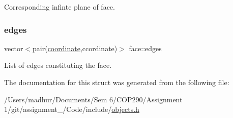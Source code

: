 Corresponding infinte plane of face. 

\mbox{\label{structface_a1cf1b3986e4c89375190db575cc537d2}} 
\subsubsection{\texorpdfstring{edges}{edges}}
{\footnotesize\ttfamily vector$<$pair(\mbox{\hyperlink{structcoordinate}{coordinate}},ccordinate)$>$ face\+::edges}



List of edges constituting the face. 



The documentation for this struct was generated from the following file\+:\begin{DoxyCompactItemize}
\item 
/\+Users/madhur/\+Documents/\+Sem 6/\+C\+O\+P290/\+Assignment 1/git/assignment\+\_/\+Code/include/\mbox{\hyperlink{objects_8h}{objects.\+h}}\end{DoxyCompactItemize}
